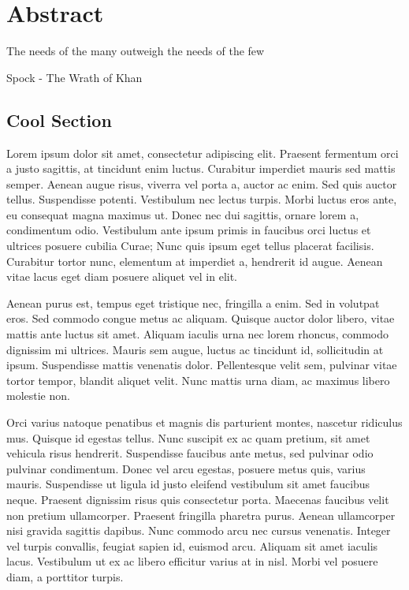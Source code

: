 \chapter{Abstract}

\begin{FraseCelebre}
  \begin{Frase}
    The needs of the many outweigh the needs of the few
  \end{Frase}
  \begin{Fuente}
    Spock - The Wrath of Khan
  \end{Fuente}
\end{FraseCelebre}

\section{Cool Section}

Lorem ipsum dolor sit amet, consectetur adipiscing elit. Praesent fermentum orci
a justo sagittis, at tincidunt enim luctus. Curabitur imperdiet mauris sed
mattis semper. Aenean augue risus, viverra vel porta a, auctor ac enim. Sed quis
auctor tellus. Suspendisse potenti. Vestibulum nec lectus turpis. Morbi luctus
eros ante, eu consequat magna maximus ut. Donec nec dui sagittis, ornare lorem
a, condimentum odio. Vestibulum ante ipsum primis in faucibus orci luctus et
ultrices posuere cubilia Curae; Nunc quis ipsum eget tellus placerat facilisis.
Curabitur tortor nunc, elementum at imperdiet a, hendrerit id augue. Aenean
vitae lacus eget diam posuere aliquet vel in elit.

Aenean purus est, tempus eget tristique nec, fringilla a enim. Sed in volutpat
eros. Sed commodo congue metus ac aliquam. Quisque auctor dolor libero, vitae
mattis ante luctus sit amet. Aliquam iaculis urna nec lorem rhoncus, commodo
dignissim mi ultrices. Mauris sem augue, luctus ac tincidunt id, sollicitudin at
ipsum. Suspendisse mattis venenatis dolor. Pellentesque velit sem, pulvinar
vitae tortor tempor, blandit aliquet velit. Nunc mattis urna diam, ac maximus
libero molestie non.

Orci varius natoque penatibus et magnis dis parturient montes, nascetur
ridiculus mus. Quisque id egestas tellus. Nunc suscipit ex ac quam pretium, sit
amet vehicula risus hendrerit. Suspendisse faucibus ante metus, sed pulvinar
odio pulvinar condimentum. Donec vel arcu egestas, posuere metus quis, varius
mauris. Suspendisse ut ligula id justo eleifend vestibulum sit amet faucibus
neque. Praesent dignissim risus quis consectetur porta. Maecenas faucibus velit
non pretium ullamcorper. Praesent fringilla pharetra purus. Aenean ullamcorper
nisi gravida sagittis dapibus. Nunc commodo arcu nec cursus venenatis. Integer
vel turpis convallis, feugiat sapien id, euismod arcu. Aliquam sit amet iaculis
lacus. Vestibulum ut ex ac libero efficitur varius at in nisl. Morbi vel posuere
diam, a porttitor turpis.

